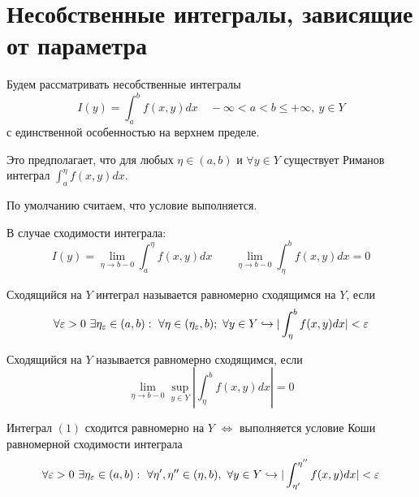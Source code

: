\documentclass{article}
\begin{document}
\section{Несобственные интегралы, зависящие от параметра}
Будем рассматривать несобственные интегралы
\[
  I(y)=\int_{a}^{b}f(x,y)dx \quad-\infty < a < b \le +\infty, \ y\in Y \tag{1}
\]
с единственной особенностью на верхнем пределе.

Это предполагает, что для любых $\eta \in (a,b)$ и $\forall y \in Y$ 
существует Риманов интеграл $\int_{a}^{\eta}f(x,y)dx$.

По умолчанию считаем, что условие выполняется.

В случае сходимости интеграла:
\[
  I(y)=\lim_{\eta \to b-0}\int_{a}^{\eta}f(x,y)dx \qquad
  \lim_{\eta\to b-0}\int_{\eta}^{b}f(x,y)dx=0
\]
\begin{definition}
  Сходящийся на $Y$ интеграл называется равномерно сходящимся на $Y$, если
  \[
    \forall \varepsilon > 0 \ \exists \eta_{\varepsilon}\in(a,b): \ \forall \eta \in (\eta_\varepsilon,b); \ \forall y \in Y 
    \hookrightarrow |\int_{\eta}^{b}f(x,y)dx|<\varepsilon
  \]
\end{definition}
\begin{definition}[Перефразирование]
  Сходящийся на $Y$ называется равномерно сходящимся, если 
  \[
    \lim_{\eta\to b-0}\sup_{y\in Y}|\int_{\eta}^{b}f(x,y)dx|=0
  \]
\end{definition}
\begin{theorem}
  Интеграл $(1)$ сходится равномерно на $Y$ 
  $\iff$ выполняется условие Коши равномерной сходимости интеграла
  \[
    \forall \varepsilon>0 \ \exists \eta_\varepsilon \in (a,b): \ \forall \eta',\eta'' \in (\eta,b), \ \forall y \in Y 
    \hookrightarrow |\int_{\eta'}^{\eta''}f(x,y)dx| < \varepsilon
  \]
\end{theorem}
\end{document}
